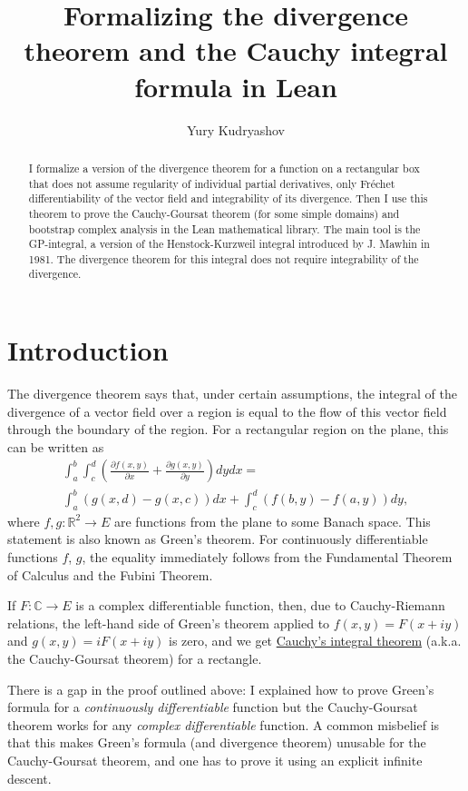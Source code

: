 \documentclass[a4paper, UKenglish,cleveref, autoref, thm-restate]{lipics-v2021}
\author{Yury Kudryashov}{University of Toronto at Mississauga, Canada (till July 2022); Texas A\&M University, USA (since August 2022)}{urkud@urkud.name}{https://orcid.org/0000-0003-4286-9276}{}
\title{Formalizing the divergence theorem and the Cauchy integral formula in Lean}
\newcommand{\bbR}{\mathbb{R}}
\newcommand{\bbC}{\mathbb{C}}
\begin{document}
\maketitle
\sloppy

\begin{abstract}
  I formalize a version of the divergence theorem for a function on a
  rectangular box that does not assume regularity of individual
  partial derivatives, only Fréchet differentiability of the vector
  field and integrability of its divergence. Then I use this theorem
  to prove the Cauchy-Goursat theorem (for some simple domains) and
  bootstrap complex analysis in the Lean mathematical library. The
  main tool is the GP-integral, a version of the Henstock-Kurzweil
  integral introduced by J. Mawhin in 1981. The divergence theorem for
  this integral does not require integrability of the divergence.
\end{abstract}

\section{Introduction}\label{sec:introduction}
The divergence theorem says that, under certain assumptions, the
integral of the divergence of a vector field over a region is equal to
the flow of this vector field through the boundary of the region. For
a rectangular region on the plane, this can be written as
\begin{multline}
  \label{eqn:green-rect}
  \int_{a}^{b}\int_{c}^{d}\left(\frac{\partial f(x, y)}{\partial x}+\frac{\partial g(x, y)}{\partial y}\right)dydx=\\
  \int_{a}^{b}\left(g(x, d)-g(x, c)\right)dx+\int_{c}^{d}\left(f(b, y)-f(a, y)\right)dy,
\end{multline}
where \(f, g\colon \bbR^{2}\to E\) are functions from the plane to
some Banach space. This statement is also known as Green's theorem.
For continuously differentiable functions \(f\), \(g\), the equality
immediately follows from the Fundamental Theorem of Calculus and the
Fubini Theorem.

If \(F\colon \bbC\to E\) is a complex differentiable function, then, due
to Cauchy-Riemann relations, the left-hand side of Green's theorem
applied to \(f(x, y)=F(x+iy)\) and \(g(x, y)=iF(x+iy)\) is zero, and
we get
\href{https://en.wikipedia.org/wiki/Cauchy's_integral_theorem}{Cauchy's
  integral theorem} (a.k.a. the Cauchy-Goursat theorem) for a rectangle.

There is a gap in the proof outlined above: I explained how to prove
Green's formula for a \emph{continuously differentiable} function
but the Cauchy-Goursat theorem works for any \emph{complex
  differentiable} function. A common misbelief is that this makes
Green's formula (and divergence theorem) unusable for the Cauchy-Goursat
theorem, and one has to prove it using an explicit infinite descent.
\end{document}
